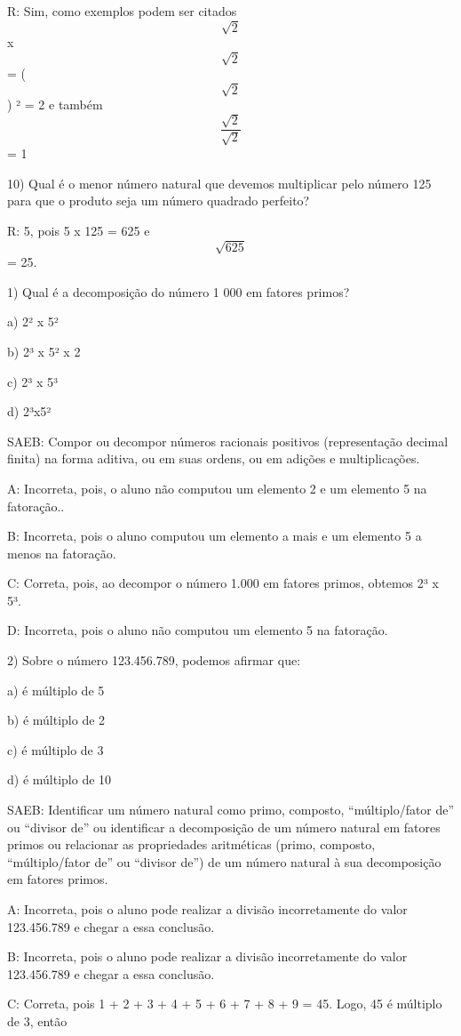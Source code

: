 R: Sim, como exemplos podem ser citados \[\sqrt{2}\] x \[\sqrt{2}\] =
(\[\sqrt{2}\]) ² = 2 e também \[\frac{\sqrt{2}}{\sqrt{2}}\] = 1

10) Qual é o menor número natural que devemos multiplicar pelo número
125 para que o produto seja um número quadrado perfeito?

R: 5, pois 5 x 125 = 625 e \[\sqrt{625}\] = 25.


1) Qual é a decomposição do número 1 000 em fatores primos?

a) 2² x 5²

b) 2³ x 5² x 2

c) 2³ x 5³

d) 2³x5²

SAEB: Compor ou decompor números racionais positivos (representação
decimal finita) na forma aditiva, ou em suas ordens, ou em adições e
multiplicações.

A: Incorreta, pois, o aluno não computou um elemento 2 e um elemento 5
na fatoração..

B: Incorreta, pois o aluno computou um elemento a mais e um elemento 5 a
menos na fatoração.

C: Correta, pois, ao decompor o número 1.000 em fatores primos, obtemos
2³ x 5³.

D: Incorreta, pois o aluno não computou um elemento 5 na fatoração.

2) Sobre o número 123.456.789, podemos afirmar que:

a) é múltiplo de 5

b) é múltiplo de 2

c) é múltiplo de 3

d) é múltiplo de 10

SAEB: Identificar um número natural como primo, composto,
``múltiplo/fator de'' ou ``divisor de'' ou identificar a decomposição de
um número natural em fatores primos ou relacionar as propriedades
aritméticas (primo, composto, ``múltiplo/fator de'' ou ``divisor de'')
de um número natural à sua decomposição em fatores primos.

A: Incorreta, pois o aluno pode realizar a divisão incorretamente do
valor 123.456.789 e chegar a essa conclusão.

B: Incorreta, pois o aluno pode realizar a divisão incorretamente do
valor 123.456.789 e chegar a essa conclusão.

C: Correta, pois 1 + 2 + 3 + 4 + 5 + 6 + 7 + 8 + 9 = 45. Logo, 45 é
múltiplo de 3, então

